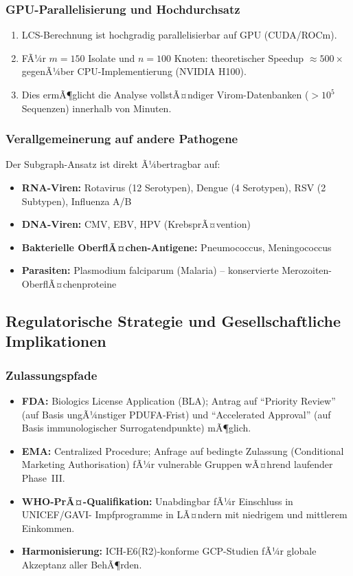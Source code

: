 ﻿\documentclass[a4paper,12pt]{article}
\theoremstyle{plain}
\theoremstyle{definition}
\theoremstyle{remark}
\begin{document}
\subsubsection{GPU-Parallelisierung und Hochdurchsatz}

\begin{enumerate}
  \item LCS-Berechnung ist hochgradig parallelisierbar auf GPU (CUDA/ROCm).
  \item FÃ¼r $m=150$ Isolate und $n=100$ Knoten: theoretischer Speedup $\approx500\times$
        gegenÃ¼ber CPU-Implementierung (NVIDIA H100).
  \item Dies ermÃ¶glicht die Analyse vollstÃ¤ndiger Virom-Datenbanken ($>10^5$ Sequenzen)
        innerhalb von Minuten.
\end{enumerate}

\subsubsection{Verallgemeinerung auf andere Pathogene}

Der Subgraph-Ansatz ist direkt Ã¼bertragbar auf:

\begin{itemize}
  \item \textbf{RNA-Viren:} Rotavirus (12 Serotypen), Dengue (4 Serotypen),
        RSV (2 Subtypen), Influenza A/B
  \item \textbf{DNA-Viren:} CMV, EBV, HPV (KrebsprÃ¤vention)
  \item \textbf{Bakterielle OberflÃ¤chen-Antigene:} Pneumococcus, Meningococcus
  \item \textbf{Parasiten:} Plasmodium falciparum (Malaria) -- konservierte Merozoiten-
        OberflÃ¤chenproteine
\end{itemize}

\subsection{Regulatorische Strategie und Gesellschaftliche Implikationen}

\subsubsection{Zulassungspfade}

\begin{itemize}
  \item \textbf{FDA:} Biologics License Application (BLA); Antrag auf
        ``Priority Review'' (auf Basis ungÃ¼nstiger PDUFA-Frist) und
        ``Accelerated Approval'' (auf Basis immunologischer Surrogatendpunkte) mÃ¶glich.
  \item \textbf{EMA:} Centralized Procedure; Anfrage auf bedingte Zulassung
        (Conditional Marketing Authorisation) fÃ¼r vulnerable Gruppen wÃ¤hrend laufender Phase~III.
  \item \textbf{WHO-PrÃ¤-Qualifikation:} Unabdingbar fÃ¼r Einschluss in UNICEF/GAVI-
        Impfprogramme in LÃ¤ndern mit niedrigem und mittlerem Einkommen.
  \item \textbf{Harmonisierung:} ICH-E6(R2)-konforme GCP-Studien fÃ¼r globale
        Akzeptanz aller BehÃ¶rden.
\end{itemize}
\end{document}
